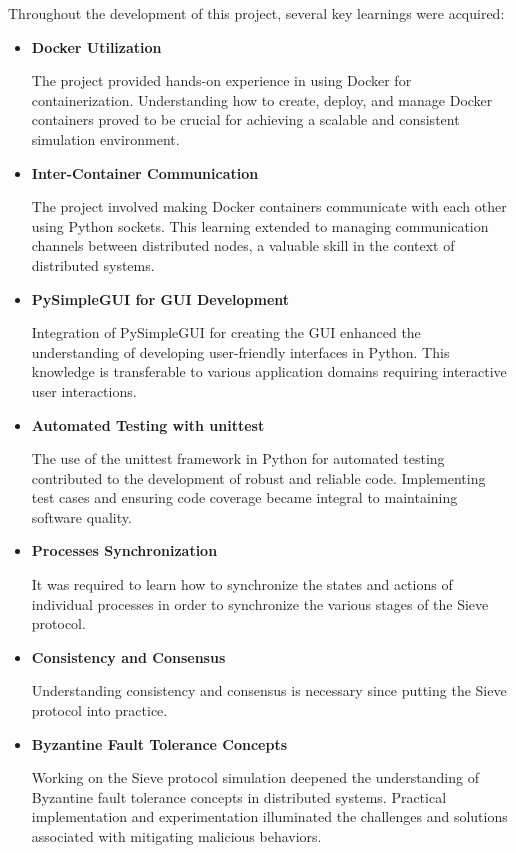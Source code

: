 \documentclass{scrartcl}
\begin{document}
Throughout the development of this project, several key learnings were acquired:

\begin{itemize}
    \item \textbf{Docker Utilization}
    
    The project provided hands-on experience in using Docker for containerization. Understanding how to create, deploy, and manage Docker containers proved to be crucial for achieving a scalable and consistent simulation environment.

    \item \textbf{Inter-Container Communication}
    
    The project involved making Docker containers communicate with each other using Python sockets. This learning extended to managing communication channels between distributed nodes, a valuable skill in the context of distributed systems.

    \item \textbf{PySimpleGUI for GUI Development}
    
    Integration of PySimpleGUI for creating the GUI enhanced the understanding of developing user-friendly interfaces in Python. This knowledge is transferable to various application domains requiring interactive user interactions.

    \item \textbf{Automated Testing with unittest}
    
    The use of the unittest framework in Python for automated testing contributed to the development of robust and reliable code. Implementing test cases and ensuring code coverage became integral to maintaining software quality.

    \item \textbf{Processes Synchronization}

    It was required to learn how to synchronize the states and actions of individual processes in order to synchronize the various stages of the Sieve protocol.

    \item \textbf{Consistency and Consensus}

    Understanding consistency and consensus is necessary since putting the Sieve protocol into practice.

    \item \textbf{Byzantine Fault Tolerance Concepts}
    
    Working on the Sieve protocol simulation deepened the understanding of Byzantine fault tolerance concepts in distributed systems. Practical implementation and experimentation illuminated the challenges and solutions associated with mitigating malicious behaviors.

\end{itemize}
\end{document}
